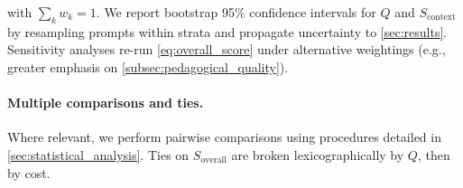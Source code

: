 with $\sum_k w_k = 1$. We report bootstrap 95\% confidence intervals for $Q$ and $S_{\text{context}}$ by resampling prompts within strata and propagate uncertainty to \cref{sec:results}. Sensitivity analyses re-run \cref{eq:overall_score} under alternative weightings (e.g., greater emphasis on \cref{subsec:pedagogical_quality}).

\paragraph{Multiple comparisons and ties.} Where relevant, we perform pairwise comparisons using procedures detailed in \cref{sec:statistical_analysis}. Ties on $S_{\text{overall}}$ are broken lexicographically by $Q$, then by cost.
